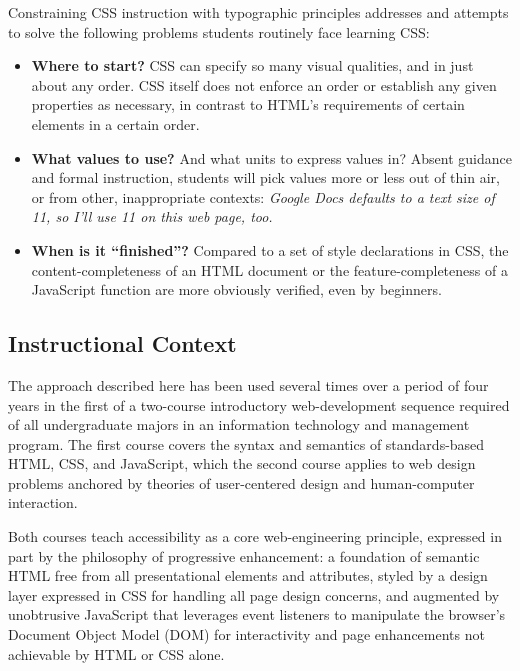 \documentclass[sigconf,sigplan,review,anonymous]{acmart}
\begin{document}
Constraining CSS instruction with typographic principles addresses and attempts to solve the following problems students routinely face learning CSS:


\begin{itemize}
  \item \textbf{Where to start?} CSS can specify so many visual qualities, and in just about any order. CSS itself does not enforce an order or establish any given properties as necessary, in contrast to HTML’s requirements of certain elements in a certain order.
  \item \textbf{What values to use?} And what units to express values in? Absent guidance and formal instruction, students will pick values more or less out of thin air, or from other, inappropriate contexts: {\itshape Google Docs defaults to a text size of 11, so I’ll use 11 on this web page, too.}
  \item \textbf{When is it “finished”?} Compared to a set of style declarations in CSS, the content-completeness of an HTML document or the feature-completeness of a \linebreak JavaScript function are more obviously verified, even by beginners.
\end{itemize}




\subsection{Instructional Context}
The approach described here has been used several times over a period of four years in the first of a two-course introductory web-development sequence required of all undergraduate majors in an information technology and management program. The first course covers the syntax and semantics of standards-based HTML, CSS, and JavaScript, which the second course applies to web design problems anchored by theories of user-centered design and human-computer interaction.

Both courses teach accessibility as a core web-engineering principle, expressed in part by the philosophy of progressive enhancement: a foundation of semantic HTML free from all presentational elements and attributes, styled by a design layer expressed in CSS for handling all page design concerns, and augmented by unobtrusive JavaScript that leverages event listeners to manipulate the browser’s Document Object Model (DOM) for interactivity and page enhancements not achievable by HTML or CSS alone.
\end{document}
